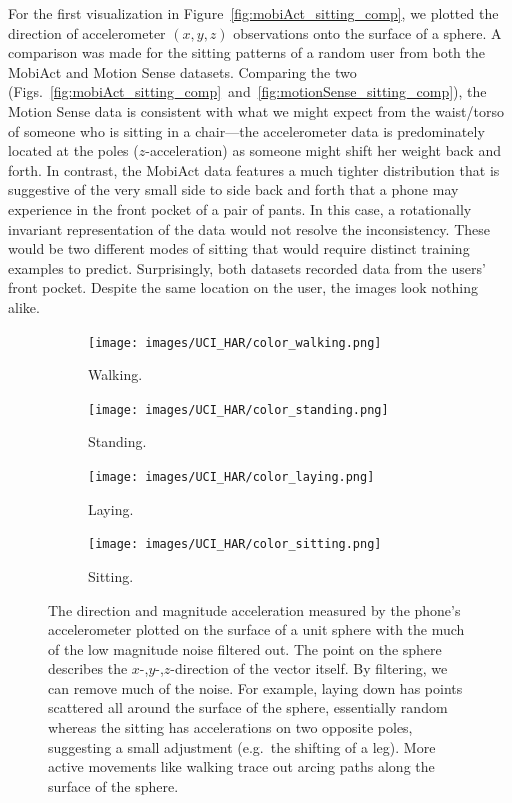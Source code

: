 For the first visualization in Figure~\ref{fig:mobiAct_sitting_comp}, we plotted the direction of accelerometer $(x,y,z)$ observations onto the surface of a sphere. A comparison was made for the sitting patterns of a random user from both the MobiAct and Motion Sense datasets.  Comparing the two (Figs.~\ref{fig:mobiAct_sitting_comp}~and~\ref{fig:motionSense_sitting_comp}), the Motion Sense data is consistent with what we might expect from the waist/torso of someone who is sitting in a chair---the accelerometer data is predominately located at the poles ($z$-acceleration) as someone might shift her weight back and forth. In contrast, the MobiAct data features a much tighter distribution that is suggestive of the very small side to side back and forth that a phone may experience in the front pocket of a pair of pants. In this case, a rotationally invariant representation of the data would not resolve the inconsistency. These would be two different modes of sitting that would require distinct training examples to predict. Surprisingly, both datasets recorded data from the users' front pocket. Despite the same location on the user, the images look nothing alike. 

\begin{figure}[H]
\begin{subfigure}{.5\textwidth}
  \centering
    \texttt{[image: images/UCI\_HAR/color\_walking.png]}
    \caption{Walking.}
    \label{fig:uci_walking}
\end{subfigure}
\begin{subfigure}{.5\textwidth}
  \centering
  \centering
  \texttt{[image: images/UCI\_HAR/color\_standing.png]}  
  \caption{Standing.}
  \label{fig:uci_standing}
\end{subfigure}
\begin{subfigure}{0.5 \textwidth}
  \centering
  \texttt{[image: images/UCI\_HAR/color\_laying.png]}  
  \caption{Laying.}
  \label{fig:uci_laying}
\end{subfigure}
%
\begin{subfigure}{0.5 \textwidth}
  \centering
  \texttt{[image: images/UCI\_HAR/color\_sitting.png]}  
  \caption{Sitting.}
  \label{fig:uci_sitting}
\end{subfigure}
\caption{The direction and magnitude acceleration measured by the phone's accelerometer plotted on the surface of a unit sphere with the much of the low magnitude noise filtered out. The point on the sphere describes the $x$-,$y$-,$z$-direction of the vector itself. By filtering, we can remove much of the noise. For example, laying down has points scattered all around the surface of the sphere, essentially random whereas the sitting has accelerations on two opposite poles, suggesting a small adjustment (e.g.\ the shifting of a leg). More active movements like walking trace out arcing paths along the surface of the sphere.}
\label{fig:uci}
\end{figure}



